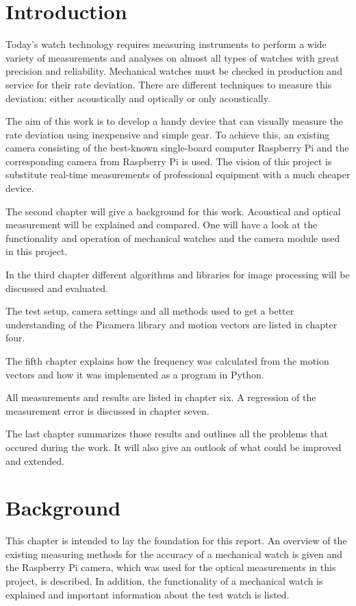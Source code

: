 \documentclass[12pt, a4paper]{report}
\begin{document}
\pagebreak
    \setcounter{secnumdepth}{5} 
    \setcounter{tocdepth}{5} 
    \tableofcontents
    \pagebreak
    
    \chapter{Introduction}
    Today's watch technology requires measuring instruments to perform a wide variety of measurements and analyses on almost all types of watches with great precision and reliability.
    Mechanical watches must be checked in production and service for their rate deviation.
    There are different techniques to measure this deviation: either acoustically and optically or only acoustically.

    
    The aim of this work is to develop a handy device that can visually measure the rate deviation using inexpensive and simple gear.
    To achieve this, an existing camera consisting of the best-known single-board computer Raspberry Pi and the corresponding camera from Raspberry Pi is used.
    The vision of this project is substitute real-time measurements of professional equipment with a much cheaper device. 


    The second chapter will give a background for this work. Acoustical and optical measurement will be explained and compared. One will have a look at the functionality and operation of mechanical watches and the camera module used in this project.


    In the third chapter different algorithms and libraries for image processing will be discussed and evaluated. 

    
    The test setup, camera settings and all methods used to get a better understanding of the Picamera library and motion vectors are listed in chapter four. 

    
    The fifth chapter explains how the frequency was calculated from the motion vectors and how it was implemented as a program in Python. 

    
    All measurements and results are listed in chapter six. A regression of the measurement error is discussed in chapter seven.

    
    The last chapter summarizes those results and outlines all the problems that occured during the work. It will also give an outlook of what could be improved and extended.

    \chapter{Background}
    This chapter is intended to lay the foundation for this report. An overview of the existing measuring methods for the accuracy of a mechanical watch is given and the Raspberry Pi camera, which was used for the optical measurements in this project, is described. In addition, the functionality of a mechanical watch is explained and important information about the test watch is listed.
\end{document}
